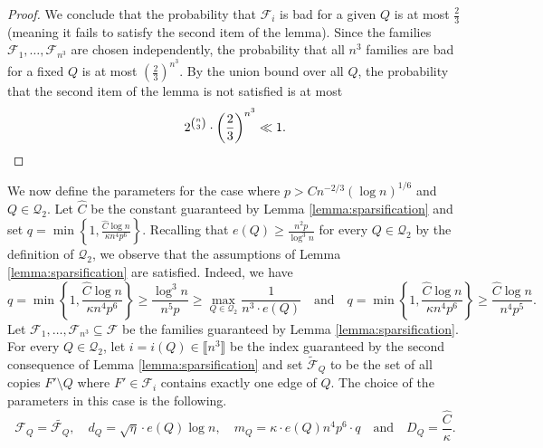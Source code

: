 \documentclass[11pt,a4paper,oneside,reqno]{amsart}
\newcommand{\cF}{\mathcal{F}}
\newcommand{\cQ}{\mathcal{Q}}
\newcommand{\1}{\mathbbm{1}} %
\newcommand{\br}[1]{\llbracket{#1}\rrbracket}
\renewcommand{\ge}{\geqslant}
\begin{document}
\begin{proof}
    We conclude that the probability that $\cF_i$ is bad for a given $Q$ is at most $\frac{2}{3}$ (meaning it fails to satisfy the second item of the lemma). Since the families $\cF_1, \dots, \cF_{n^3}$ are chosen independently, the probability that all $n^3$ families are bad for a fixed $Q$ is at most $\left(\frac{2}{3}\right)^{n^3}$. By the union bound over all $Q$, the probability that the second item of the lemma is not satisfied is at most
    \[
        2^{\binom{n}{3}} \cdot \left(\frac{2}{3}\right)^{n^3} \ll 1. \qedhere
    \]    
\end{proof}

We now define the parameters for the case where $p > C n^{-2/3} \left(\log n\right)^{1/6}$ and $Q \in \cQ_2$. Let $\hat{C}$ be the constant guaranteed by Lemma \ref{lemma:sparsification} and set $q = \min\left\{1, \frac{\hat{C} \log n}{\kappa n^4 p^6}\right\}$. Recalling that $e(Q) \ge \frac{n^2 p}{\log^3 n}$ for every $Q \in \cQ_2$ by the definition of $\cQ_2$, we observe that the assumptions of Lemma \ref{lemma:sparsification} are satisfied. Indeed, we have
\[
    q = \min\left\{1, \frac{\hat{C} \log n}{\kappa n^4 p^6}\right\} \ge \frac{\log^3 n}{n^5 p} \ge \max_{Q \in \cQ_2} \frac{1}{n^3 \cdot e(Q)} \quad \text{and} \quad q = \min\left\{1, \frac{\hat{C} \log n}{\kappa n^4 p^6}\right\} \ge \frac{\hat{C} \log n}{ n^4 p^5}.
\]
Let $\cF_1, \dots, \cF_{n^3} \subseteq \cF$ be the families guaranteed by Lemma \ref{lemma:sparsification}. For every $Q \in \cQ_2$, let $i = i(Q) \in \br{n^3}$ be the index guaranteed by the second consequence of Lemma \ref{lemma:sparsification} and set $\tilde{\cF}_Q$ to be the set of all copies $F' \setminus Q$ where $F' \in \cF_i$ contains exactly one edge of $Q$. The choice of the parameters in this case is the following.
\[
    \cF_Q = \tilde{\cF_Q},\quad d_Q = \sqrt{\eta} \cdot e(Q) \log n,\quad m_Q = \kappa \cdot e(Q) n^4 p^6 \cdot q \quad \text{and} \quad D_Q = \frac{\hat{C}}{\kappa}.
\]
\end{document}
